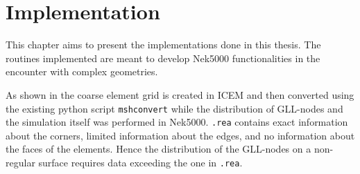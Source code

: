 
\chapter{Implementation} %

\label{implementation} %






This chapter aims to present the implementations done in this thesis. 
The routines implemented are meant to develop Nek5000 functionalities 
in the encounter with complex geometries. 

As shown in  the coarse element grid is created
in ICEM and then converted using the existing python script \verb|mshconvert| while the
distribution of GLL-nodes and the simulation itself was performed in Nek5000.
\verb|.rea| contains exact information about the corners,
limited information about the edges, and no information about the faces of the elements.
Hence the distribution of the GLL-nodes on a non-regular surface requires data exceeding the one in \verb|.rea|.



